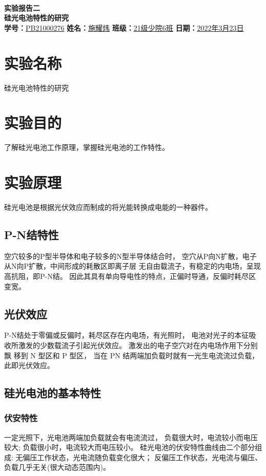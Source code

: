 \documentclass{article}
\date{2022年3月}
\def\kong{\hspace*{2em}}
\begin{document}
\setcounter{page}{1}
\thispagestyle{empty}
\kong
\\[10pt]
\begin{center}
	\textbf{\huge \heiti 实验报告二}\\[6pt]
    \textbf{\huge \heiti 硅光电池特性的研究}\\[12pt]
	\textbf{学号：}\underline{\kaishu PB21000276} \qquad 
    \textbf{姓名：}\underline{\kaishu 施耀炜} \qquad 
    \textbf{班级：}\underline{\kaishu 21级少院6班}\qquad 
    \textbf{日期：}\underline{2022年3月23日}\\[24pt]
\end{center}
\section{实验名称}
    \kong 硅光电池特性的研究
\section{实验目的}
    \kong 了解硅光电池工作原理，掌握硅光电池的工作特性。
\section{实验原理}
    \kong 硅光电池是根据光伏效应而制成的将光能转换成电能的一种器件。
    \subsection{P-N结特性}
        \kong 空穴较多的P型半导体和电子较多的N型半导体结合时，
        空穴从P向N扩散，电子从N向P扩散，中间形成的耗散区即离子层
        无自由载流子，有稳定的内电场，呈现高抗阻，即P-N结。
        因此其具有单向导电性的特点，正偏时导通，反偏时耗尽区变宽。
    \subsection{光伏效应}
        \kong P-N结处于零偏或反偏时，耗尽区存在内电场，有光照时，
        电池对光子的本征吸收所激发的少数载流子引起光伏效应。
        激发出的电子空穴对在内电场作用下分别飘 移到 N 型区和 P 型区，
        当在 PN 结两端加负载时就有一光生电流流过负载，此即光伏效应。
    \subsection{硅光电池的基本特性}
        \subsubsection{伏安特性}
            \kong 一定光照下，光电池两端加负载就会有电流流过，
            负载很大时，电流较小而电压较大;
            负载很小时，电流较大而电压较小。
            硅光电池的伏安特性曲线由二个部分组成: 
            无偏压工作状态，光电流随负载变化很大；
            反偏压工作状态，光电流与偏压、负载几乎无关(很大动态范围内)。
\end{document}
